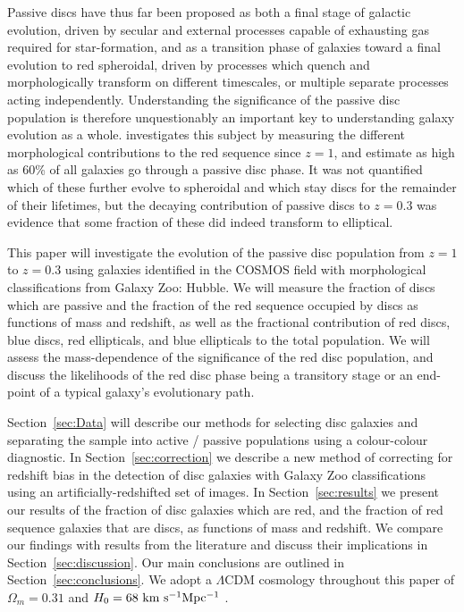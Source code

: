 \documentclass[useAMS,usenatbib]{mn2e}
\begin{document}
Passive discs have thus far been proposed as both a final stage of galactic evolution, driven by secular and external processes capable of exhausting gas required for star-formation, and as a transition phase of galaxies toward a final evolution to red spheroidal, driven by processes which quench and morphologically transform on different timescales, or multiple separate processes acting independently. Understanding the significance of the passive disc population is therefore unquestionably an important key to understanding galaxy evolution as a whole. \citet{Bundy2010} investigates this subject by measuring the different morphological contributions to the red sequence since $z=1$, and estimate as high as 60\% of all galaxies go through a passive disc phase. It was not quantified which of these further evolve to spheroidal and which stay discs for the remainder of their lifetimes, but the decaying contribution of passive discs to $z=0.3$ was evidence that some fraction of these did indeed transform to elliptical.

This paper will investigate the evolution of the passive disc population from $z=1$ to $z=0.3$ using galaxies identified in the COSMOS field with morphological classifications from Galaxy Zoo: Hubble. We will measure the fraction of discs which are passive and the fraction of the red sequence occupied by discs as functions of mass and redshift, as well as the fractional contribution of red discs, blue discs, red ellipticals, and blue ellipticals to the total population. We will assess the mass-dependence of the significance of the red disc population, and discuss the likelihoods of the red disc phase being a transitory stage or an end-point of a typical galaxy's evolutionary path.

Section~\ref{sec:Data} will describe our methods for selecting disc galaxies and separating the sample into active / passive populations using a colour-colour diagnostic. In Section~\ref{sec:correction} we describe a new method of correcting for redshift bias in the detection of disc galaxies with Galaxy Zoo classifications using an artificially-redshifted set of images. In Section~\ref{sec:results} we present our results of the fraction of disc galaxies which are red, and the fraction of red sequence galaxies that are discs, as functions of mass and redshift. We compare our findings with results from the literature and discuss their implications in Section~\ref{sec:discussion}. Our main conclusions are outlined in Section~\ref{sec:conclusions}. We adopt a $\Lambda$CDM cosmology throughout this paper of $\Omega_m=0.31$ and $H_0=68~\rm km~s^{-1} Mpc^{-1}$ \citep{PlanckCollaboration2015}.
\end{document}
